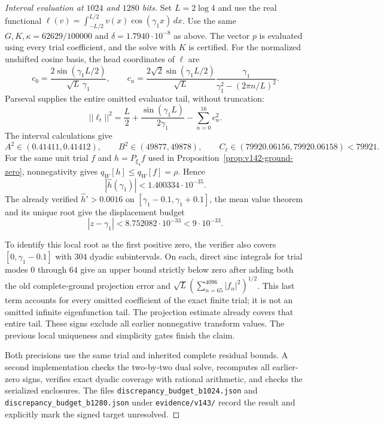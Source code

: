 \documentclass[11pt]{article}
\def\norm#1{||#1||}%
\theoremstyle{remark}
\newcommand{\norm}[1]{\left\lVert #1\right\rVert}
\begin{document}
\begin{proof}[Interval evaluation at $1024$ and $1280$ bits]
Set $L=2\log4$ and use the real functional
$\ell(v)=\int_{-L/2}^{L/2}v(x)\cos(\gamma_1x)\,dx$.
Use the same $G,K,\kappa=62629/100000$ and
$\delta=1.7940\cdot10^{-8}$ as above. The vector $p$ is evaluated
using every trial coefficient, and the solve with $K$ is certified.
For the normalized unshifted cosine basis, the head coordinates of
$\ell$ are
\[
 c_0=\frac{2\sin(\gamma_1L/2)}{\sqrt L\,\gamma_1},\qquad
 c_n=\frac{2\sqrt2\sin(\gamma_1L/2)}{\sqrt L}
       \frac{\gamma_1}{\gamma_1^2-(2\pi n/L)^2}.
\]
Parseval supplies the entire omitted evaluator tail, without truncation:
\[
 \norm{\ell_t}^2=\frac L2+\frac{\sin(\gamma_1L)}{2\gamma_1}
                    -\sum_{n=0}^{16}c_n^2.
\]
The interval calculations give
\[
 A^2\in(0.41411,0.41412),\qquad
 B^2\in(49877,49878),\qquad C_\ell\in(79920.06156,79920.06158)<79921.
\]
For the same unit trial $f$ and $h=P_{\xi_4}f$ used in
Proposition~\ref{prop:v142-ground-zero}, nonnegativity gives
$q_W[h]\le q_W[f]=\rho$. Hence
\[
 |\widehat h(\gamma_1)|<1.400334\cdot10^{-35}.
\]
The already verified $\widehat h'>0.0016$ on
$[\gamma_1-0.1,\gamma_1+0.1]$, the mean value theorem and its unique
root give the displacement budget
\[
 |z-\gamma_1|<8.752082\cdot10^{-33}<9\cdot10^{-33}.
\]

To identify this local root as the first positive zero, the verifier
also covers $[0,\gamma_1-0.1]$ with $304$ dyadic subintervals.
On each, direct sinc integrals for trial modes $0$ through $64$ give
an upper bound strictly below zero after adding both the old
complete-ground projection error and
$\sqrt L(\sum_{n=65}^{4096}|f_n|^2)^{1/2}$. This last term accounts
for every omitted coefficient of the exact finite trial; it is not
an omitted infinite eigenfunction tail. The projection estimate
already covers that entire tail. These signs exclude all earlier
nonnegative transform values. The previous local uniqueness and
simplicity gates finish the claim.

Both precisions use the same trial and inherited complete residual
bounds. A second implementation checks the two-by-two dual solve,
recomputes all earlier-zero signs, verifies exact dyadic coverage
with rational arithmetic, and checks the serialized enclosures.
The files \texttt{discrepancy\_budget\_b1024.json} and
\texttt{discrepancy\_budget\_b1280.json} under \texttt{evidence/v143/}
record the result and explicitly mark the signed target unresolved.
\end{proof}
\end{document}
